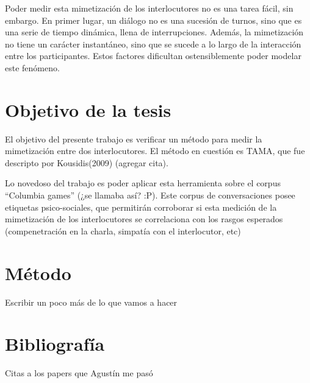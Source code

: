 \documentclass[a4paper,11pt]{article}
\begin{document}
Poder medir esta mimetización de los interlocutores no es una tarea fácil, sin embargo. En primer lugar, un diálogo no es una sucesión de turnos, sino que es una serie de tiempo dinámica, llena de interrupciones. Además, la mimetización no tiene un carácter instantáneo, sino que se sucede a lo largo de la interacción entre los participantes. Estos factores dificultan ostensiblemente poder modelar este fenómeno.

\section{Objetivo de la tesis}

El objetivo del presente trabajo es verificar un método para medir la mimetización entre dos interlocutores. El método en cuestión es TAMA, que fue descripto por Kousidis(2009) (agregar cita). 

Lo novedoso del trabajo es poder aplicar esta herramienta sobre el corpus ``Columbia games'' (¿se llamaba así? :P). Este corpus de conversaciones posee etiquetas psico-sociales, que permitirán corroborar si esta medición de la mimetización de los interlocutores se correlaciona con los rasgos esperados (compenetración en la charla, simpatía con el interlocutor, etc)

\section{Método}

Escribir un poco más de lo que vamos a hacer

\section{Bibliografía}

Citas a los papers que Agustín me pasó 
\end{document}
